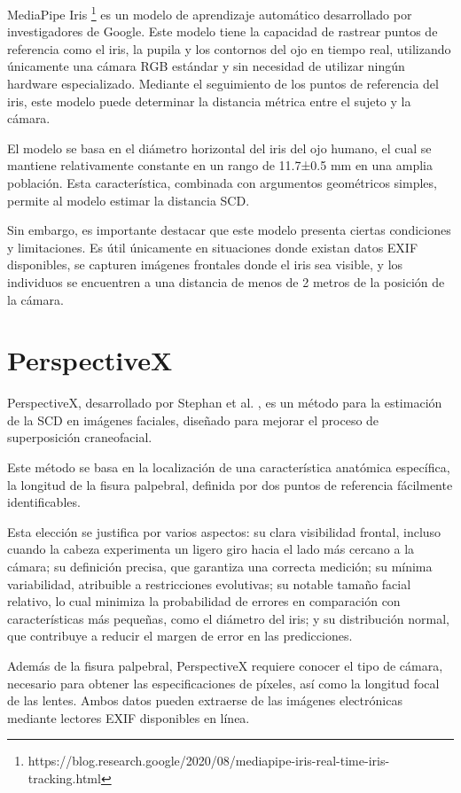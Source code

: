 MediaPipe Iris \footnote{https://blog.research.google/2020/08/mediapipe-iris-real-time-iris-tracking.html} es un modelo de aprendizaje automático desarrollado por investigadores de Google. Este modelo tiene la capacidad de rastrear puntos de referencia como el iris, la pupila y los contornos del ojo en tiempo real, utilizando únicamente una cámara RGB estándar y sin necesidad de utilizar ningún hardware especializado. Mediante el seguimiento de los puntos de referencia del iris, este modelo puede determinar la distancia métrica entre el sujeto y la cámara.

El modelo se basa en el diámetro horizontal del iris del ojo humano, el cual se mantiene relativamente constante en un rango de 11.7±0.5 mm en una amplia población. Esta característica, combinada con argumentos geométricos simples, permite al modelo estimar la distancia SCD.

Sin embargo, es importante destacar que este modelo presenta ciertas condiciones y limitaciones. Es útil únicamente en situaciones donde existan datos EXIF disponibles, se capturen imágenes frontales donde el iris sea visible, y los individuos se encuentren a una distancia de menos de 2 metros de la posición de la cámara.

\section{PerspectiveX}

PerspectiveX, desarrollado por Stephan et al. \cite{55}, es un método para la estimación de la SCD en imágenes faciales, diseñado para mejorar el proceso de superposición craneofacial.

Este método se basa en la localización de una característica anatómica específica, la longitud de la fisura palpebral, definida por dos puntos de referencia fácilmente identificables. 

Esta elección se justifica por varios aspectos: su clara visibilidad frontal, incluso cuando la cabeza experimenta un ligero giro hacia el lado más cercano a la cámara; su definición precisa, que garantiza una correcta medición; su mínima variabilidad, atribuible a restricciones evolutivas; su notable tamaño facial relativo, lo cual minimiza la probabilidad de errores en comparación con características más pequeñas, como el diámetro del iris; y su distribución normal, que contribuye a reducir el margen de error en las predicciones.

Además de la fisura palpebral, PerspectiveX requiere conocer el tipo de cámara, necesario para obtener las especificaciones de píxeles, así como la longitud focal de las lentes. Ambos datos pueden extraerse de las imágenes electrónicas mediante lectores EXIF disponibles en línea.

